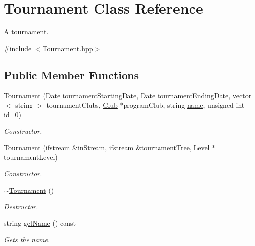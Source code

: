 \hypertarget{class_tournament}{}\section{Tournament Class Reference}
\label{class_tournament}


A tournament.  




{\ttfamily \#include $<$Tournament.\+hpp$>$}

\subsection*{Public Member Functions}
\begin{DoxyCompactItemize}
\item 
\hyperlink{class_tournament_a65490b32c093ace034b15ec8cbe75795}{Tournament} (\hyperlink{class_date}{Date} \hyperlink{class_tournament_afe5c5994c15194a320914831d05e40fc}{tournament\+Starting\+Date}, \hyperlink{class_date}{Date} \hyperlink{class_tournament_a85027b414ba2ddd7cd513c399588d2a8}{tournament\+Ending\+Date}, vector$<$ string $>$ tournament\+Clubs, \hyperlink{class_club}{Club} $\ast$program\+Club, string \hyperlink{class_tournament_a6d4f678a73d89147d34bb1d0c50cc976}{name}, unsigned int \hyperlink{class_tournament_a15cf54c0cde58d9a29c9700808173a8c}{id}=0)
\begin{DoxyCompactList}\small\item\em Constructor. \end{DoxyCompactList}\item 
\hyperlink{class_tournament_a4d5e4eb2007fb6873b5e4e91f70d565b}{Tournament} (ifstream \&in\+Stream, ifstream \&\hyperlink{class_tournament_a561cd3b82b192558910f85ae1c1f5bea}{tournament\+Tree}, \hyperlink{class_level}{Level} $\ast$tournament\+Level)
\begin{DoxyCompactList}\small\item\em Constructor. \end{DoxyCompactList}\item 
\hyperlink{class_tournament_a3cd15abb3e9599c60ae124fed5a04ee5}{$\sim$\+Tournament} ()
\begin{DoxyCompactList}\small\item\em Destructor. \end{DoxyCompactList}\item 
string \hyperlink{class_tournament_a94cfb5371bd09ab75a50a13ef924ae58}{get\+Name} () const
\begin{DoxyCompactList}\small\item\em Gets the name. \end{DoxyCompactList}\item 

\end{DoxyCompactItemize}

